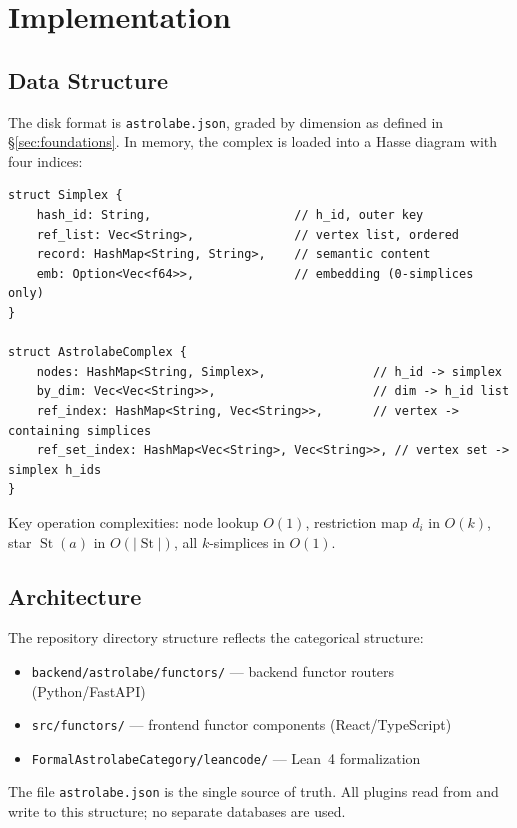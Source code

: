 \section{Implementation}
\label{sec:implementation}

\subsection{Data Structure}

The disk format is \texttt{astrolabe.json}, graded by dimension as defined in \S\ref{sec:foundations}. In memory, the complex is loaded into a Hasse diagram with four indices:

\begin{lstlisting}[basicstyle=\scriptsize\ttfamily]
struct Simplex {
    hash_id: String,                    // h_id, outer key
    ref_list: Vec<String>,              // vertex list, ordered
    record: HashMap<String, String>,    // semantic content
    emb: Option<Vec<f64>>,              // embedding (0-simplices only)
}

struct AstrolabeComplex {
    nodes: HashMap<String, Simplex>,               // h_id -> simplex
    by_dim: Vec<Vec<String>>,                      // dim -> h_id list
    ref_index: HashMap<String, Vec<String>>,       // vertex -> containing simplices
    ref_set_index: HashMap<Vec<String>, Vec<String>>, // vertex set -> simplex h_ids
}
\end{lstlisting}

Key operation complexities: node lookup $O(1)$, restriction map $d_i$ in $O(k)$, star $\operatorname{St}(a)$ in $O(|\operatorname{St}|)$, all $k$-simplices in $O(1)$.

\subsection{Architecture}

The repository directory structure reflects the categorical structure:
\begin{itemize}
\item \texttt{backend/astrolabe/functors/} --- backend functor routers (Python/FastAPI)
\item \texttt{src/functors/} --- frontend functor components (React/TypeScript)
\item \texttt{FormalAstrolabeCategory/leancode/} --- Lean~4 formalization
\end{itemize}
The file \texttt{astrolabe.json} is the single source of truth. All plugins read from and write to this structure; no separate databases are used.

